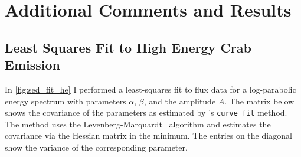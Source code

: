 \chapter{Additional Comments and Results}
\label{ap:appendix}

\section{Least Squares Fit to High Energy Crab Emission}
\label{ap:lsqrs}
In \cref{fig:sed_fit_he} I performed a least-squares fit to flux data for a log-parabolic energy spectrum with
parameters $\alpha$, $\beta$, and the amplitude $A$.
The matrix below shows the covariance of the parameters as estimated by \scipy's \lstinline{curve_fit} method. 
The \scipy method uses the Levenberg-Marquardt~\cite{levenberg} algorithm and estimates the covariance via the Hessian matrix in the minimum. 
The entries on the diagonal show the variance of the corresponding parameter.
\begin{equation*}
    
\end{equation*}



\newpage

